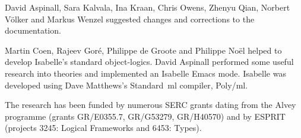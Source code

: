David Aspinall, Sara Kalvala, Ina Kraan, Chris Owens, Zhenyu Qian, Norbert
V{\"o}lker and Markus Wenzel suggested changes and corrections to the
documentation.

Martin Coen, Rajeev Gor\'e, Philippe de Groote and Philippe No\"el helped
to develop Isabelle's standard object-logics.  David Aspinall performed
some useful research into theories and implemented an Isabelle Emacs mode.
Isabelle was developed using Dave Matthews's Standard~{\sc ml} compiler,
Poly/{\sc ml}.  

The research has been funded by numerous SERC grants dating from the Alvey
programme (grants GR/E0355.7, GR/G53279, GR/H40570) and by ESPRIT (projects
3245: Logical Frameworks and 6453: Types).
